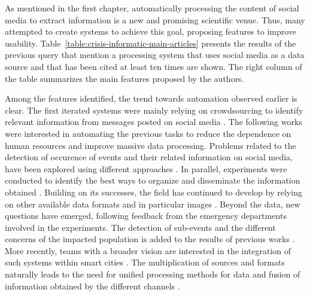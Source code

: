 As mentioned in the first chapter, automatically processing the content of social media to extract information is a new and promising scientific venue.
Thus, many attempted to create systems to achieve this goal, proposing features to improve usability.
Table~\ref{table:crisis-informatic-main-articles} presents the results of the previous query that mention a processing system that uses social media as a data source and that has been cited at least ten times are shown.
The right column of the table summarizes the main features proposed by the authors.

Among the features identified, the trend towards automation observed earlier is clear.
The first iterated systems were mainly relying on crowdsourcing to identify relevant information from messages posted on social media
\parencite{schulzCrisisInformationManagement2012, backfriedOpenSourceIntelligence2012,imranAIDRArtificialIntelligence2014}.
The following works were interested in automating the previous tasks to reduce the dependence on human resources and improve massive data processing.
Problems related to the detection of occurence of events and their related information on social media, have been explored using different approaches \parencite{imranAIDRArtificialIntelligence2014,middletonRealtimeCrisisMapping2014,avvenutiEARSEarthquakeAlert2014, gibsonCombiningBigSocial2014}.
In parallel, experiments were conducted to identify the best ways to organize and disseminate the information obtained \parencite{middletonRealtimeCrisisMapping2014,huangDisasterMapperCyberGISFramework2015,avvenutiPullingInformationSocial2016,grunder-fahrerTopicsTopicalPhases2018}.
Building on its successes, the field has continued to develop by relying on other available data formats and in particular images \parencite{alamImage4ActOnlineSocial2017,nguyenAutomaticImageFiltering2017,agarwalCrisisDIASMultimodalDamage2020}.
Beyond the data, new questions have emerged, following feedback from the emergency departments involved in the experiments.
The detection of sub-events and the different concerns of the impacted population is added to the results of previous works \parencite{wuStreamExplorerMultiStageSystem2018,raginiBigDataAnalytics2018,grunder-fahrerTopicsTopicalPhases2018}.
More recently, teams with a broader vision are interested in the integration of such systems within smart cities \parencite{shahDisasterResilientSmart2019}.
The multiplication of sources and formats naturally leads to the need for unified processing methods for data and fusion of information obtained by the different channels \parencite{alamDescriptiveVisualSummaries2020}.


